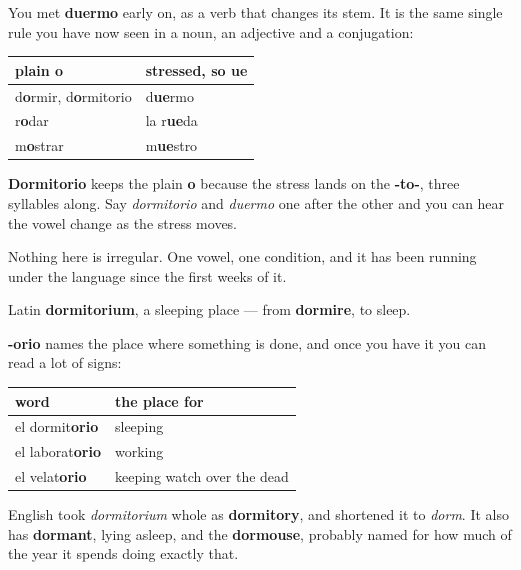 \begin{grammarlens}[title={Grammar Lens: the vowel that has been breaking all along}]
You met \textbf{duermo} early on, as a verb that changes its stem. It is the same single rule you have now seen in a noun, an adjective and a conjugation:

\noindent
\begin{tabularx}{\linewidth}{@{}>{\raggedright\arraybackslash}X>{\raggedright\arraybackslash}X@{}}
\toprule
\textbf{plain o} & \textbf{stressed, so ue} \\
\midrule
d\textbf{o}rmir, d\textbf{o}rmitorio & d\textbf{ue}rmo \\
r\textbf{o}dar & la r\textbf{ue}da \\
m\textbf{o}strar & m\textbf{ue}stro \\
\bottomrule
\end{tabularx}

\textbf{Dormitorio} keeps the plain \textbf{o} because the stress lands on the \textbf{-to-}, three syllables along. Say \emph{dormitorio} and \emph{duermo} one after the other and you can hear the vowel change as the stress moves.

Nothing here is irregular. One vowel, one condition, and it has been running under the language since the first weeks of it.
\end{grammarlens}

\begin{cousinweb}
Latin \textbf{dormitorium}, a sleeping place — from \textbf{dormire}, to sleep.

\textbf{-orio} names the place where something is done, and once you have it you can read a lot of signs:

\noindent
\begin{tabularx}{\linewidth}{@{}>{\raggedright\arraybackslash}X>{\raggedright\arraybackslash}X@{}}
\toprule
\textbf{word} & \textbf{the place for} \\
\midrule
el dormit\textbf{orio} & sleeping \\
el laborat\textbf{orio} & working \\
el velat\textbf{orio} & keeping watch over the dead \\
\bottomrule
\end{tabularx}

English took \emph{dormitorium} whole as \textbf{dormitory}, and shortened it to \emph{dorm}. It also has \textbf{dormant}, lying asleep, and the \textbf{dormouse}, probably named for how much of the year it spends doing exactly that.
\end{cousinweb}

